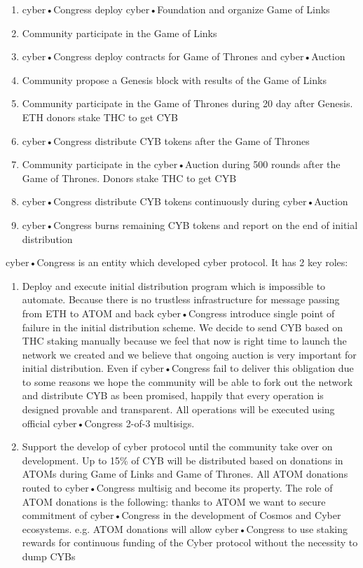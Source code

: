 \documentclass[8pt,oneside]{amsart}
\begin{document}
\begin{Abstract}
\begin{enumerate}
 \item cyber•Congress deploy cyber•Foundation and organize Game of Links
 \item Community participate in the Game of Links
 \item cyber•Congress deploy contracts for Game of Thrones and cyber•Auction
 \item Community propose a Genesis block with results of the Game of Links
 \item Community participate in the Game of Thrones during 20 day after Genesis. ETH donors stake THC to get CYB
 \item cyber•Congress distribute CYB tokens after the Game of Thrones
 \item Community participate in the cyber•Auction during 500 rounds after the Game of Thrones. Donors stake THC to get CYB
 \item cyber•Congress distribute CYB tokens continuously during cyber•Auction
 \item cyber•Congress burns remaining CYB tokens and report on the end of initial distribution
\end{enumerate}

cyber•Congress is an entity which developed cyber protocol. It has 2 key roles:
\begin{enumerate}
 \item Deploy and execute initial distribution program which is impossible to automate. Because there is no trustless infrastructure for message passing from ETH to ATOM and back cyber•Congress introduce single point of failure in the initial distribution scheme. We decide to send CYB based on THC staking manually because we feel that now is right time to launch the network we created and we believe that ongoing auction is very important for initial distribution. Even if cyber•Congress fail to deliver this obligation due to some reasons we hope the community will be able to fork out the network and distribute CYB as been promised, happily that every operation is designed provable and transparent. All operations will be executed using official cyber•Congress 2-of-3 multisigs.
 \item Support the develop of cyber protocol until the community take over on development. Up to 15\% of CYB will be distributed based on donations in ATOMs during Game of Links and Game of Thrones. All ATOM donations routed to cyber•Congress multisig and become its property. The role of ATOM donations is the following: thanks to ATOM we want to secure commitment of cyber•Congress in the development of Cosmos and Cyber ecosystems. e.g. ATOM donations will allow cyber•Congress to use staking rewards for continuous funding of the Cyber protocol without the necessity to dump CYBs
\end{enumerate}


\end{Abstract}
\end{document}
